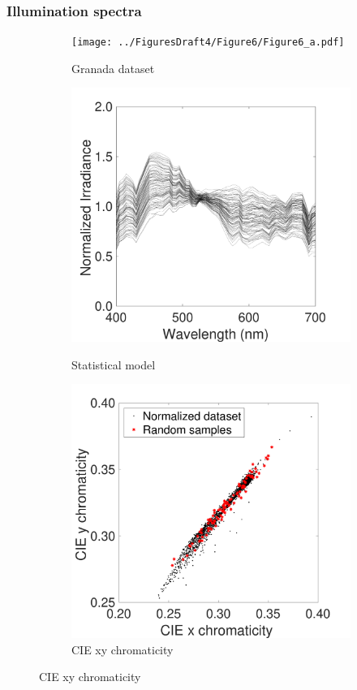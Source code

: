\documentclass{jov}
\begin{document}
\subsubsection{Illumination spectra}
\begin{figure}
\centering
    \begin{subfigure}[b]{0.24 \textwidth}
    \centering
	\caption{Granada dataset}
        \texttt{[image: ../FiguresDraft4/Figure6/Figure6\_a.pdf]}
        \label{fig:granadaData}
    \end{subfigure}
	\begin{subfigure}[b]{0.24 \textwidth}
    \centering
        \caption{Statistical model}
        \includegraphics[width=\textwidth]{../FiguresDraft4/Figure6/Figure6_b.pdf}
        \label{fig:illuminantSamples}
    \end{subfigure}
      	\begin{subfigure}[b]{0.24 \textwidth}
    \centering
        \caption{CIE xy chromaticity}
        \includegraphics[width=\textwidth]{../FiguresDraft4/Figure6/Figure6_c.pdf}

\end{subfigure}
\end{figure}
\end{document}

